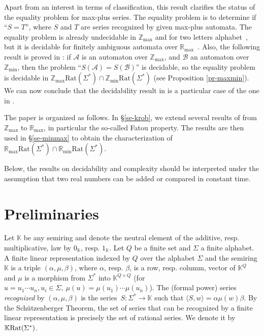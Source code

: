 \documentclass{article}
\newcommand{\mrm}[1]{\text{\rm #1}}
\def\cA{{\mathcal A}}
\def\cB{{\mathcal B}}
\newcommand{\Z} {\ensuremath{\mathbb{Z}}}
\newcommand{\R} {\ensuremath{\mathbb{R}}}
\newcommand{\K} {\ensuremath{\mathbb{K}}}
\newcommand{\Zmin} {\Z_{\min}}
\newcommand{\Zmax} {\Z_{\max}}
\newcommand{\Rmin} {\R_{\min}}
\newcommand{\Rmax} {\R_{\max}}
\newcommand{\1}{\mathbb{1}}
\newcommand{\0}{\mathbb{0}}
\newcommand{\coef}[2]{\langle #1, #2\rangle}
\def\Rat{\text{Rat}}
\def\ab{\Sigma}
\begin{document}
Apart from an interest in terms of classification, this result 
clarifies the status of the equality problem for 
max-plus series. The equality problem is to determine if ``$S=T$'',
where $S$ and $T$ are series recognized by given max-plus
automata. The equality problem is already undecidable in $\Zmax$ and
for two letters alphabet~\cite{krob}, but it is decidable for
finitely ambiguous automata over $\Rmax$~\cite{HIJi,webe94}. Also, the following result
is proved in \cite{krob94}: if $\cA$ is an automaton over $\Zmax$, and
$\cB$ an automaton over $\Zmin$, then the problem ``$S(\cA)=S(\cB)$'' is
decidable, so the equality problem is decidable 
in $\Zmax\Rat(\Sigma^*)\cap \Zmin\Rat(\Sigma^*)$ (see Proposition \ref{pr-maxmin}). We can now
conclude that the decidability result in \cite{krob94} is a particular
case of the one in \cite{HIJi,webe94}. 

\medskip

The paper is organized as follows. In \S \ref{se-krob}, we extend several
results of \cite{krob94} from $\Zmax$ to $\Rmax$, in particular the
so-called Fatou property. The
results are then used in \S \ref{se-minmax} to obtain the characterization of
$\Rmax\Rat(\Sigma^*)\cap \Rmin\Rat(\Sigma^*)$. 

\medskip

Below, the results on decidability and
complexity should be interpreted under the assumption that two real
numbers can be added or compared in constant time. 

\section{Preliminaries}\label{se-prel}


Let $\mathbb{K}$ be any semiring and denote the neutral element of
the additive, resp. multiplicative, law by $0_\mathbb{K}$,
resp. $1_\mathbb{K}$. 
Let $Q$ be a finite set and $\ab$ a finite alphabet.
A finite linear representation indexed by $Q$ over the alphabet $\ab$
and the semiring $\mathbb{K}$
is a triple $(\alpha,\mu,\beta)$, where
$\alpha$, resp. $\beta$, is a row, resp. columm, vector
of $\K^{Q}$ and $\mu$ is a morphism from $\ab^*$ into $\K^{Q\times Q}$
(for $u=u_1\cdots u_n, u_i\in \Sigma, \ \mu(u)=\mu(u_1)\cdots \mu(u_n)$).
The (formal power) series {\it recognized} by $(\alpha,\mu,\beta)$ is the
series~$S:\ab^* \rightarrow \K$ such that $\coef{S}{w}=\alpha\mu(w)\beta$.
By the Sch\"{u}tzenberger
Theorem, the set of series that can be
recognized by a finite linear representation is precisely the set of
rational series. We denote it by $\mathbb{K}\mrm{Rat}(\ab^*)$.
\end{document}
